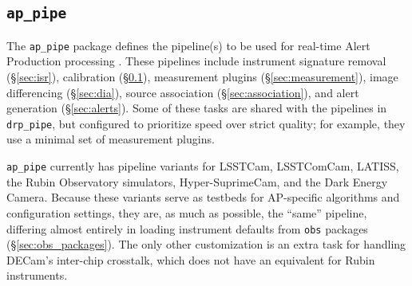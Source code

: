 \subsection{\texttt{ap\_pipe}}

The \texttt{ap\_pipe} package defines the pipeline(s) to be used for real-time Alert Production processing \citep{DMTN-219}.
These pipelines include instrument signature removal (\S\ref{sec:isr}), calibration (\S\ref{}), measurement plugins (\S\ref{sec:measurement}), image differencing (\S\ref{sec:dia}), source association (\S\ref{sec:association}), and alert generation (\S\ref{sec:alerts}).
Some of these tasks are shared with the pipelines in \texttt{drp\_pipe}, but configured to prioritize speed over strict quality; for example, they use a minimal set of measurement plugins.

\texttt{ap\_pipe} currently has pipeline variants for LSSTCam, LSSTComCam, LATISS, the Rubin Observatory simulators, Hyper-SuprimeCam, and the Dark Energy Camera.
Because these variants serve as testbeds for AP-specific algorithms and configuration settings, they are, as much as possible, the ``same'' pipeline, differing almost entirely in loading instrument defaults from \texttt{obs} packages (\S\ref{sec:obs_packages}).
The only other customization is an extra task for handling DECam's inter-chip crosstalk, which does not have an equivalent for Rubin instruments.
